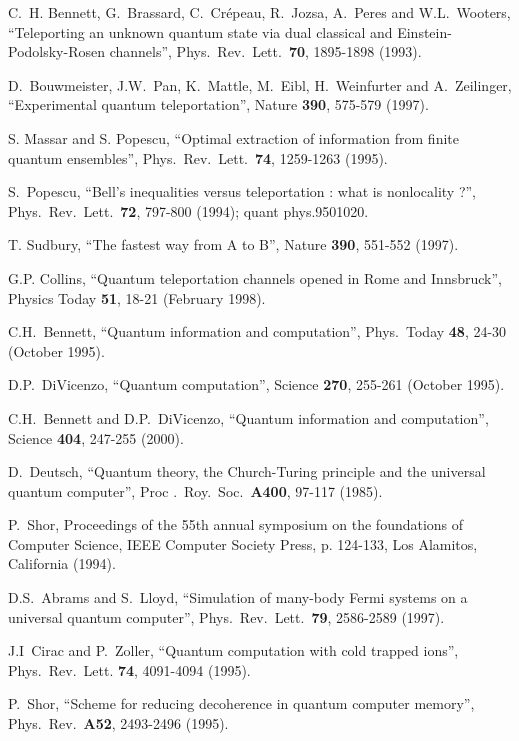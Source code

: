 \documentclass[12pt,onecolumn]{article}%
\begin{document}
\begin{thebibliography}{999}
C.\ H. Bennett, G.\ Brassard, C.\ Cr\'{e}peau, R.\ Jozsa,
A.\ Peres and W.L.\ Wooters, ``Teleporting an unknown quantum state via dual
classical and Einstein-Podolsky-Rosen channels'',
Phys.\ Rev.\ Lett.\ \textbf{70}, 1895-1898 (1993).

D.\ Bouwmeister, J.W.\ Pan, K.\ Mattle, M.\ Eibl,
H.\ Weinfurter and A.\ Zeilinger, ``Experimental quantum teleportation'',
Nature \textbf{390}, 575-579 (1997).

S. Massar and S. Popescu, ``Optimal extraction of information
from finite quantum ensembles'', Phys.\ Rev.\ Lett.\ \textbf{74}, 1259-1263 (1995).

S.\ Popescu, ``Bell's inequalities versus teleportation :
what is nonlocality ?'', Phys.\ Rev.\ Lett.\ \textbf{72}, 797-800 (1994);
quant phys.9501020.

T. Sudbury, ``The fastest way from A to B'', Nature
\textbf{390}, 551-552 (1997).

G.P. Collins, ``Quantum teleportation channels opened
in Rome and Innsbruck'', Physics Today \textbf{51}, 18-21 (February 1998).

C.H.\ Bennett, ``Quantum information and computation'',
Phys.\ Today \textbf{48}, 24-30 (October 1995).

D.P.\ DiVicenzo, ``Quantum computation'', Science
\textbf{270}, 255-261 (October 1995).

C.H.\ Bennett and D.P.\ DiVicenzo, ``Quantum information and
computation'', Science \textbf{404}, 247-255 (2000).

D.\ Deutsch, ``Quantum theory, the Church-Turing principle
and the universal quantum computer'', Proc .\ Roy.\ Soc.\ \textbf{A400},
97-117 (1985).

P.\ Shor, Proceedings of the 55th annual symposium on the
foundations of Computer Science, IEEE Computer Society Press, p. 124-133, Los
Alamitos, California (1994).

D.S.\ Abrams and S.\ Lloyd, ``Simulation of many-body Fermi
systems on a universal quantum computer'', Phys.\ Rev.\ Lett.\ \textbf{79},
2586-2589 (1997).

J.I\ Cirac and P.\ Zoller, ``Quantum computation with
cold trapped ions'', Phys.\ Rev.\ Lett. \textbf{74}, 4091-4094 (1995).

P.\ Shor, ``Scheme for reducing decoherence in quantum
computer memory'', Phys.\ Rev.\ \textbf{A52}, 2493-2496 (1995).


\end{thebibliography}
\end{document}
